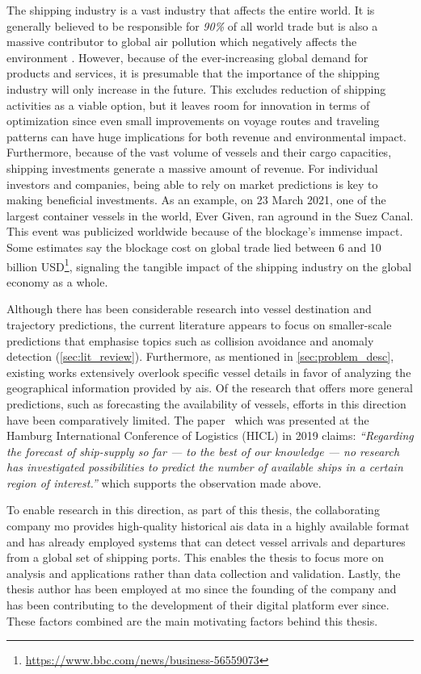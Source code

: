 The shipping industry is a vast industry that affects the entire world. It is generally believed to be responsible for \textit{90\%} of all world trade \parencite{grote2016} but is also a massive contributor to global air pollution which negatively affects the environment \parencite{zheng2016:online}. However, because of the ever-increasing global demand for products and services, it is presumable that the importance of the shipping industry will only increase in the future. This excludes reduction of shipping activities as a viable option, but it leaves room for innovation in terms of optimization since even small improvements on voyage routes and traveling patterns can have huge implications for both revenue and environmental impact. Furthermore, because of the vast volume of vessels and their cargo capacities, shipping investments generate a massive amount of revenue. For individual investors and companies, being able to rely on market predictions is key to making beneficial investments. As an example, on 23 March 2021, one of the largest container vessels in the world, Ever Given, ran aground in the Suez Canal. This event was publicized worldwide because of the blockage's immense impact. Some estimates say the blockage cost on global trade lied between 6 and 10 billion USD\footnote{\url{https://www.bbc.com/news/business-56559073}}, signaling the tangible impact of the shipping industry on the global economy as a whole.

Although there has been considerable research into vessel destination and trajectory predictions, the current literature appears to focus on smaller-scale predictions that emphasise topics such as collision avoidance and anomaly detection (\cref{sec:lit_review}). Furthermore, as mentioned in \cref{sec:problem_desc}, existing works extensively overlook specific vessel details in favor of analyzing the geographical information provided by \acrshort{ais}. Of the research that offers more general predictions, such as forecasting the availability of vessels, efforts in this direction have been comparatively limited. The paper~\cite{lechtenberg2019} which was presented at the Hamburg International Conference of Logistics (HICL) in 2019 claims: \textit{“Regarding the forecast of ship-supply so far --- to the best of our knowledge --- no research has investigated possibilities to predict the number of available ships in a certain region of interest.”} which supports the observation made above.

To enable research in this direction, as part of this thesis, the collaborating company \acrfull{mo} provides high-quality historical \acrshort{ais} data in a highly available format and has already employed systems that can detect vessel arrivals and departures from a global set of shipping ports. This enables the thesis to focus more on analysis and applications rather than data collection and validation. Lastly, the thesis author has been employed at \acrshort{mo} since the founding of the company and has been contributing to the development of their digital platform ever since. These factors combined are the main motivating factors behind this thesis.


